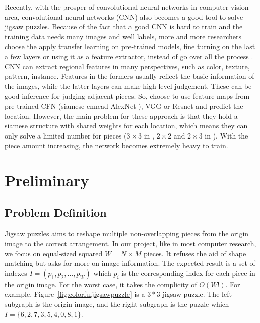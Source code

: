 \documentclass{article}
\begin{document}
Recently, with the prosper of convolutional neural networks in computer vision area, convolutional neural networks (CNN) also becomes a good tool to solve jigsaw puzzles. Because of the fact that a good CNN is hard to train and the training data needs many images and well labels, more and more researchers choose the apply transfer learning on pre-trained models, fine turning on the last a few layers or using it as a feature extractor, instead of go over all the process \cite{razavian2014cnn}. CNN can extract regional features in many perspectives, such as color, texture, pattern, instance. Features in the formers usually reflect the basic information of the images, while the latter layers can make high-level judgement. These can be good inference for judging adjacent pieces. So, \cite{deryneural,noroozi2016unsupervised} choose to use feature maps from pre-trained CFN \cite{noroozi2016unsupervised} (siamese-ennead AlexNet \cite{krizhevsky2012imagenet}), VGG \cite{he2016deep} or Resnet \cite{simonyan2014very} and predict the location. However, the main problem for these approach is that they hold a siamese structure with shared weights for each location, which means they can only solve a limited number for pieces ($3\times3$ in \cite{noroozi2016unsupervised}, $2\times2$ and $2\times3$ in \cite{deryneural}). With the piece amount increasing, the network becomes extremely heavy to train.

\section{Preliminary}

\subsection{Problem Definition}

Jigsaw puzzles aims to reshape multiple non-overlapping pieces from the origin image to the correct arrangement. In our project, like in most computer research, we focus on equal-sized squared $W=N\times M$ pieces. It refuses the aid of shape matching but asks for more on image information. The expected result is a set of indexes $I=(p_1,p_2,\dots,p_W)$ which $p_i$ is the corresponding index for each piece in the origin image. For the worst case, it takes the complicity of $O(W!)$. For example, Figure~\ref{fig:colorfuljigsawpuzzle} is a $3*3$ jigsaw puzzle. The left subgraph is the origin image, and the right subgraph is the puzzle which $I=\{6,2,7,3,5,4,0,8,1\}$.
\end{document}
